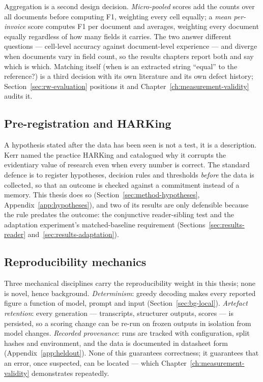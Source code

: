 Aggregation is a second design decision. \emph{Micro-pooled} scores add the counts over
all documents before computing \ac{F1}, weighting every cell equally; a \emph{mean
per-invoice} score computes \ac{F1} per document and averages, weighting every document
equally regardless of how many fields it carries. The two answer different questions ---
cell-level accuracy against document-level experience --- and diverge when documents
vary in field count, so the results chapters report both and say which is which.
Matching itself (when is an extracted string ``equal'' to the reference?) is a third
decision with its own literature and its own defect history; Section~\ref{sec:rw-evaluation}
positions it and Chapter~\ref{ch:measurement-validity} audits it.

\subsection{Pre-registration and HARKing}

A hypothesis stated after the data has been seen is not a test, it is a description.
Kerr \parencite{kerr1998} named the practice \ac{HARKing} and catalogued why it
corrupts the evidentiary value of research even when every number is correct. The
standard defence is to register hypotheses, decision rules and thresholds
\emph{before} the data is collected, so that an outcome is checked against a
commitment instead of a memory.
This thesis does so
(Section~\ref{sec:method-hypotheses}, Appendix~\ref{app:hypotheses}), and two of its results
are only defensible because the rule predates the outcome: the conjunctive reader-sibling
test and the adaptation experiment's matched-baseline requirement
(Sections~\ref{sec:results-reader} and~\ref{sec:results-adaptation}).

\subsection{Reproducibility mechanics}

Three mechanical disciplines carry the reproducibility weight in this thesis; none is
novel, hence background. \emph{Determinism}: greedy decoding makes every
reported figure a function of model, prompt and input (Section~\ref{sec:bg-local}).
\emph{Artefact retention}: every generation --- transcripts, structurer outputs, scores
--- is persisted, so a scoring change can be re-run on frozen outputs in
isolation from model changes. \emph{Recorded provenance}: runs are tracked with configuration,
split hashes and environment, and the data is documented in datasheet form
\parencite{gebru2018datasheets} (Appendix~\ref{app:heldout}). None of this guarantees
correctness; it guarantees that an error, once suspected, can be located --- which
Chapter~\ref{ch:measurement-validity} demonstrates repeatedly.
